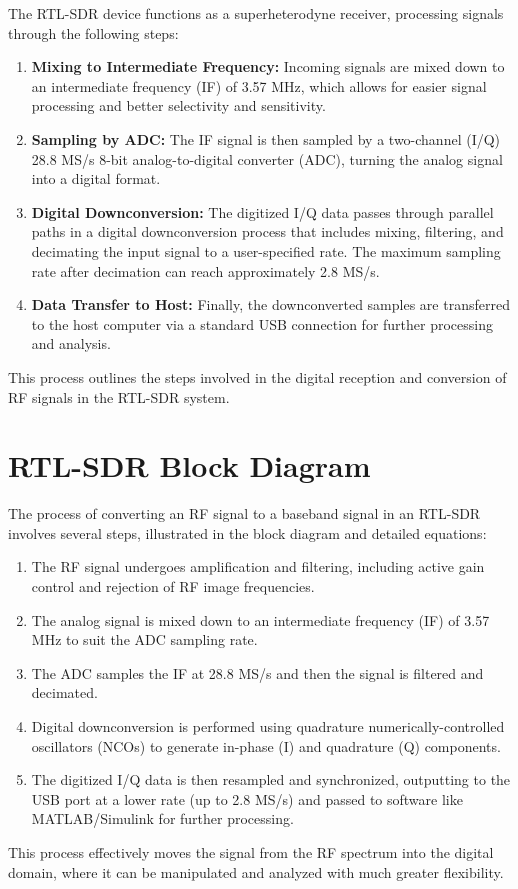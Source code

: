 The RTL-SDR device functions as a superheterodyne receiver, processing signals through the following steps:
\begin{enumerate}
    \item \textbf{Mixing to Intermediate Frequency:} Incoming signals are mixed down to an intermediate frequency (IF) of 3.57 MHz, which allows for easier signal processing and better selectivity and sensitivity.
    \item \textbf{Sampling by ADC:} The IF signal is then sampled by a two-channel (I/Q) 28.8 MS/s 8-bit analog-to-digital converter (ADC), turning the analog signal into a digital format.
    \item \textbf{Digital Downconversion:} The digitized I/Q data passes through parallel paths in a digital downconversion process that includes mixing, filtering, and decimating the input signal to a user-specified rate. The maximum sampling rate after decimation can reach approximately 2.8 MS/s.
    \item \textbf{Data Transfer to Host:} Finally, the downconverted samples are transferred to the host computer via a standard USB connection for further processing and analysis.
\end{enumerate}
This process outlines the steps involved in the digital reception and conversion of RF signals in the RTL-SDR system.


\section*{RTL-SDR Block Diagram}
The process of converting an RF signal to a baseband signal in an RTL-SDR involves several steps, illustrated in the block diagram and detailed equations:
\begin{enumerate}
    \item The RF signal undergoes amplification and filtering, including active gain control and rejection of RF image frequencies.
    \item The analog signal is mixed down to an intermediate frequency (IF) of 3.57 MHz to suit the ADC sampling rate.
    \item The ADC samples the IF at 28.8 MS/s and then the signal is filtered and decimated.
    \item Digital downconversion is performed using quadrature numerically-controlled oscillators (NCOs) to generate in-phase (I) and quadrature (Q) components.
    \item The digitized I/Q data is then resampled and synchronized, outputting to the USB port at a lower rate (up to 2.8 MS/s) and passed to software like MATLAB/Simulink for further processing.
\end{enumerate}
This process effectively moves the signal from the RF spectrum into the digital domain, where it can be manipulated and analyzed with much greater flexibility.

